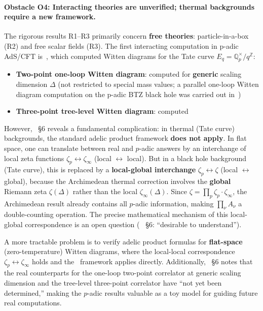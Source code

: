 \documentclass[11pt,a4paper]{article}
\newcommand{\Qp}{\mathbb{Q}_p}
\begin{document}
\paragraph{Obstacle O4: Interacting theories are unverified; thermal backgrounds require a new framework.}
The rigorous results R1--R3 primarily concern \textbf{free theories}: particle-in-a-box (R2) and free scalar fields (R3). The first interacting computation in p-adic AdS/CFT is~\cite{HJ24}, which computed Witten diagrams for the Tate curve $E_q = \Qp^\times / q^{\mathbb{Z}}$:
\begin{itemize}[leftmargin=2em]
    \item \textbf{Two-point one-loop Witten diagram}: computed for \textbf{generic} scaling dimension $\Delta$ (not restricted to special mass values; a parallel one-loop Witten diagram computation on the p-adic BTZ black hole was carried out in~\cite{ESZ19})
    \item \textbf{Three-point tree-level Witten diagram}: computed
\end{itemize}
However,~\cite{HJ24} \S6 reveals a fundamental complication: in thermal (Tate curve) backgrounds, the standard adelic product framework \textbf{does not apply}. In flat space, one can translate between real and $p$-adic answers by an interchange of local zeta functions $\zeta_p \leftrightarrow \zeta_\infty$ (local $\leftrightarrow$ local). But in a black hole background (Tate curve), this is replaced by a \textbf{local-global interchange} $\zeta_p \leftrightarrow \zeta$ (local $\leftrightarrow$ global), because the Archimedean thermal correction involves the \textbf{global} Riemann zeta $\zeta(\Delta)$ rather than the local $\zeta_\infty(\Delta)$. Since $\zeta = \prod_p \zeta_p \cdot \zeta_\infty$, the Archimedean result already contains all $p$-adic information, making $\prod_\nu A_\nu$ a double-counting operation. The precise mathematical mechanism of this local-global correspondence is an open question (~\cite{HJ24} \S6: ``desirable to understand'').

A more tractable problem is to verify adelic product formulas for \textbf{flat-space} (zero-temperature) Witten diagrams, where the local-local correspondence $\zeta_p \leftrightarrow \zeta_\infty$ holds and the~\cite{HSYZ20} framework applies directly. Additionally,~\cite{HJ24} \S6 notes that the real counterparts for the one-loop two-point correlator at generic scaling dimension and the tree-level three-point correlator have ``not yet been determined,'' making the $p$-adic results valuable as a toy model for guiding future real computations.
\end{document}
